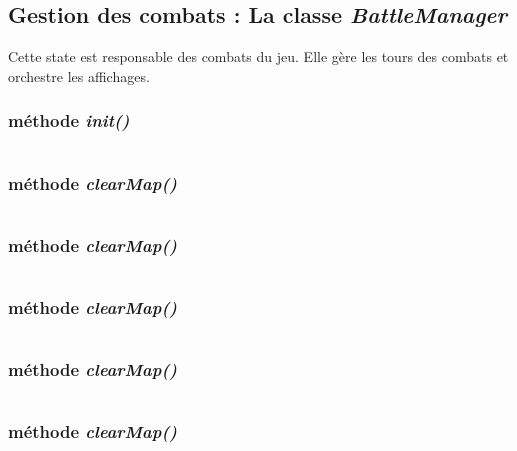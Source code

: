 \documentclass[11pt]{article}
\begin{document}
\begin{appendices}
\subsection{Gestion des combats : La classe \textit{BattleManager}}
Cette state est responsable des combats du jeu. Elle gère les tours des combats et orchestre les affichages. 
\subsubsection{méthode \textit{init()}}
\begin{lstlisting}[language=JavaScript]

\end{lstlisting} 
\subsubsection{méthode \textit{clearMap()}}
\begin{lstlisting}[language=JavaScript]

\end{lstlisting} 
\subsubsection{méthode \textit{clearMap()}}
\begin{lstlisting}[language=JavaScript]

\end{lstlisting} 
\subsubsection{méthode \textit{clearMap()}}
\begin{lstlisting}[language=JavaScript]

\end{lstlisting} 
\subsubsection{méthode \textit{clearMap()}}
\begin{lstlisting}[language=JavaScript]

\end{lstlisting} 
\subsubsection{méthode \textit{clearMap()}}
\begin{lstlisting}[language=JavaScript]

\end{lstlisting} 

\end{appendices}
\end{document}
